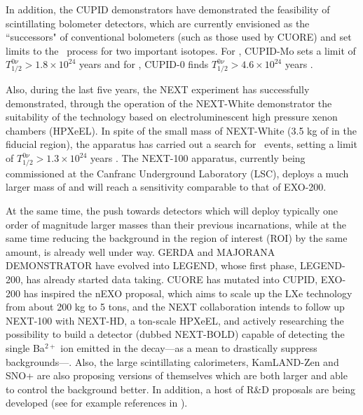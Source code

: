  In addition, the CUPID demonstrators have demonstrated the feasibility of scintillating bolometer detectors, which are currently envisioned as the ``successors" of conventional bolometers (such as those used by CUORE) and set limits to the \bbonu\ process for two important isotopes.
For , CUPID-Mo sets a limit of \mbox{$T^{0\nu}_{1/2} > 1.8 \times 10^{24}$} years \cite{Augier:2022znx}
and for , CUPID-0 finds \mbox{$T^{0\nu}_{1/2} > 4.6 \times 10^{24}$} years \cite{CUPID:2022puj}. 

Also, during the last five years, the NEXT experiment has successfully demonstrated, through the operation of the NEXT-White demonstrator the suitability of the technology based on electroluminescent high pressure xenon chambers (HPXeEL). In spite of the small mass of NEXT-White (3.5 kg of  in the fiducial region), the apparatus has carried out a search for \bbonu\ events, setting a limit of \mbox{$T^{0\nu}_{1/2} > 1.3 \times 10^{24}$} years  \cite{NEXT:2023daz}. The NEXT-100 apparatus, currently being commissioned at the Canfranc Underground Laboratory (LSC), deploys a much larger mass of  and will reach a sensitivity comparable to that of EXO-200.  

At the same time, the push towards detectors which will deploy typically one order of magnitude larger masses than their previous incarnations, while at the same time reducing the background in the region of interest (ROI) by the same amount, is already well under way. GERDA and MAJORANA DEMONSTRATOR have evolved into LEGEND, whose first phase, LEGEND-200, has already started data taking. CUORE has mutated into CUPID, EXO-200 has inspired the nEXO proposal, which aims to scale up the LXe technology from about 200 kg to 5 tons, and the NEXT collaboration intends to follow up NEXT-100 with NEXT-HD, a ton-scale HPXeEL, and actively researching the possibility to build a detector (dubbed NEXT-BOLD) capable of detecting the single Ba$^{2+}$ ion emitted in the decay---as a mean to drastically suppress backgrounds---. Also, the large scintillating calorimeters, KamLAND-Zen and SNO+ are also proposing versions of themselves which are both larger and able to control the background better. In addition, a host of R\&D proposals are being developed (see for example references in \cite{Dell_Oro_2016}). 

